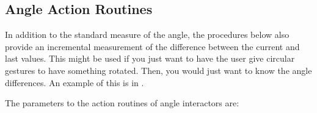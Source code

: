 \subsection{Angle Action Routines}
\label{anglecustomaction}

In addition to the standard measure of the angle, the
procedures below also provide an incremental measurement of the difference
between the current and last values.  This might be used if you just want
to have the user give circular gestures to have something rotated.  Then,
you would just want to know the angle differences.  An example of this is in
.

The parameters to the action routines of angle interactors are:

